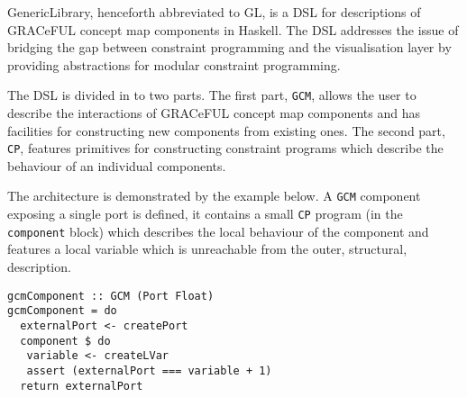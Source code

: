 GenericLibrary, henceforth abbreviated to GL, is a DSL for descriptions
of GRACeFUL concept map components in Haskell. The DSL addresses the issue
of bridging the gap between constraint programming and the visualisation
layer by providing abstractions for modular constraint programming.

The DSL is divided in to two parts. The first part, \texttt{GCM}, allows the user to describe the
interactions of GRACeFUL concept map components and has facilities for
constructing new components from existing ones. The second part,
\texttt{CP}, features primitives for constructing constraint programs
which describe the behaviour of an individual components.

The architecture is demonstrated by the example below. A \texttt{GCM}
component exposing a single port is defined, it contains a small \texttt{CP} program (in the
\texttt{component} block) which describes the local behaviour of the
component and features a local variable which is unreachable from the
outer, structural, description.

\begin{verbatim}
gcmComponent :: GCM (Port Float)
gcmComponent = do
  externalPort <- createPort
  component $ do
   variable <- createLVar
   assert (externalPort === variable + 1)
  return externalPort
\end{verbatim}

